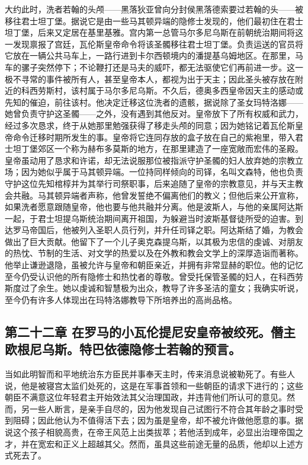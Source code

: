 大约此时，洗者若翰的头颅——黑落狄亚曾向分封侯黑落德索要过若翰的头——被移往君士坦丁堡。据说它是由一些马其顿异端的隐修士发现的，他们最初住在君士坦丁堡，后来又定居在基里基雅。宫内第一总管马尔多尼乌斯在前朝统治期间将这一发现禀报了宫廷，瓦伦斯皇帝命令将该圣髑移往君士坦丁堡。负责运送的官员将它放在一辆公共马车上，一路行进到卡尔西顿境内的潘提基乌姆地区。在那里，马车的骡子突然停下；不论鞭打还是马夫的威吓，都无法驱使它们再前进一步。这一极不寻常的事件被所有人，甚至皇帝本人，都视为出于天主；因此圣头被存放在附近的科西劳斯村，该村属于马尔多尼乌斯。不久后，德奥多西皇帝因天主的感动或先知的催迫，前往该村。他决定迁移这位洗者的遗骸，据说除了圣女玛特洛娜——她曾负责守护这圣髑——之外，没有遇到其他反对。皇帝放下了所有权威和武力，经过多次恳求，终于从她那里勉强获得了移走头颅的同意；因为她铭记着瓦伦斯皇帝命令迁移时期所发生的事。皇帝将它连同存放的盒子放在自己的紫袍里，带入君士坦丁堡郊区一个称为赫布多莫斯的地方，在那里建造了一座宽敞而宏伟的圣殿。皇帝虽动用了恳求和许诺，却无法说服那位被指派守护圣髑的妇人放弃她的宗教立场；因为她似乎属于马其顿异端。一位持同样倾向的司铎，名叫文森特，他也负责守护这位先知棺椁并为其举行司祭职事，后来追随了皇帝的宗教意见，并与天主教会共融。马其顿异端者声称，他曾发誓绝不偏离他们的教义；但他后来公开宣称，如果洗者愿意跟随皇帝，他也要与他共融并分离。他是波斯人，与他的亲属阿达斯一起，于君士坦提乌斯统治期间离开祖国，为躲避当时波斯基督徒所受的迫害。到达罗马帝国后，他被列入圣职人员行列，并升任司铎之职。阿达斯结了婚，为教会做出了巨大贡献。他留下了一个儿子奥克森提乌斯，以其极为忠信的虔诚、对朋友的热忱、节制的生活、对文学的热爱以及在外教和教会文学上的深厚造诣而著称。他举止谦逊退隐，虽被允许与皇帝和朝臣亲近，并拥有非常显赫的职位。他的记忆至今仍受认识他的所有隐修士和热忱者的尊敬。曾受托保管圣髑的妇人，在科西劳斯度过了余生。她以虔诚和智慧极为出众，教导了许多圣洁的童女；我确实听说，至今仍有许多人体现出在玛特洛娜教导下所培养出的高尚品格。\par


\subsection{第二十二章 在罗马的小瓦伦提尼安皇帝被绞死。僭主欧根尼乌斯。特巴依德隐修士若翰的预言。}

当如此明智而和平地统治东方臣民并事奉天主时，传来消息说被勒死了。有些人说，他是被寝宫太监们处死的，这是在军事首领和一些朝臣的请求下进行的；这些朝臣不满意这位年轻君主开始效法其父治理国政，并违背他们所认可的意见。然而，另一些人断言，是亲手自尽的，因为他发现自己试图行不符合其年龄之事时受到阻碍；因此他认为不值得活下去；因为虽是皇帝，却不被允许做他愿意的事。据说这个孩子相貌高贵，在帝王风范上出类拔萃；若他活到成年，必显出治理帝国之才，并在宽宏和正义上超越其父。然而，虽具这些前途无量的品质，他却以上述方式死去了。\par

